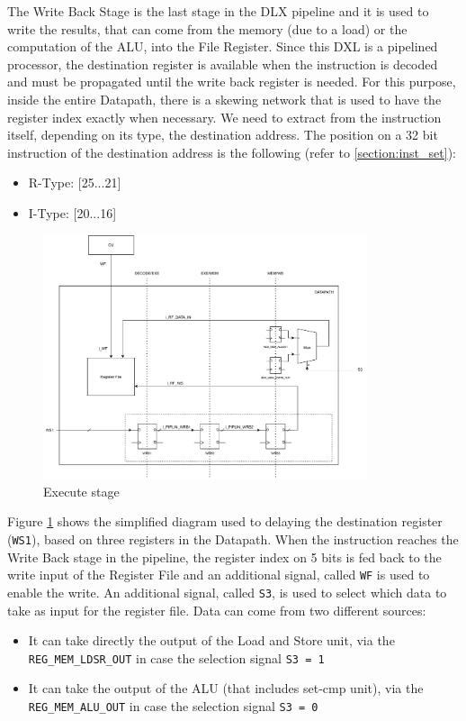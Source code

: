 
The Write Back Stage is the last stage in the DLX pipeline and it is used to write the results, that can come from the memory (due to a load) or the computation of the ALU, into the File Register.
Since this DXL is a pipelined processor, the destination register is available when the instruction is decoded and must be propagated until the write back register is needed. For this purpose, inside the entire Datapath, there is a skewing network that is used to have the register index exactly when necessary. \newline\newline
We need to extract from the instruction itself, depending on its type, the destination address. The position on a 32 bit instruction of the destination address is the following (refer to \ref{section:inst_set}):
\begin{itemize}
    \itemsep0sp
    \item R-Type: [25...21]
    \item I-Type: [20...16]
\end{itemize}
\begin{figure}[H]   
    \centering
    \includegraphics[width=0.85\textwidth]{chapters/7_WriteBackStage/images/writeback.pdf}
    \caption{Execute stage}
    \label{fig:wb_stage}
\end{figure}
Figure \ref{fig:wb_stage} shows the simplified diagram used to delaying the destination register (\texttt{WS1}), based on three registers in the Datapath.
When the instruction reaches the Write Back stage in the pipeline, the register index on 5 bits is fed back to the write input of the Register File and an additional signal, called \texttt{WF} is used to enable the write.\newline\newline
An additional signal, called \texttt{S3}, is used to select which data to take as input for the register file. Data can come from two different sources:
\begin{itemize}
    \itemsep0sp
    \item It can take directly the output of the Load and Store unit, via the \texttt{REG\_MEM\_LDSR\_OUT} in case the selection signal \texttt{S3 = 1}
    \item It can take the output of the ALU (that includes set-cmp unit), via the \texttt{REG\_MEM\_ALU\_OUT} in case the selection signal \texttt{S3 = 0}
\end{itemize}

